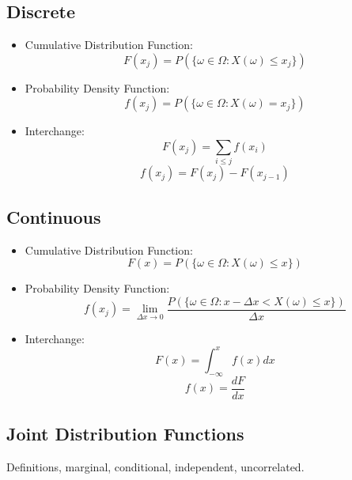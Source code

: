 \documentclass[a4paper,12pt]{article}
\begin{document}
\subsection{Discrete}
\begin{itemize}
\item Cumulative Distribution Function:
\begin{equation}
F(x_j) = P( \{\omega \in \Omega : X(\omega) \le x_j \} )
\end{equation}
\item Probability Density Function:
\begin{equation}
f(x_j) = P( \{ \omega \in \Omega : X(\omega) = x_j \} )
\end{equation}
\item Interchange:
\begin{equation}
F(x_j) = \sum_{i \le j} f(x_i)
\end{equation}
\begin{equation}
f(x_j) = F(x_j) - F(x_{j-1})
\end{equation}
\end{itemize}

\subsection{Continuous}
\begin{itemize}
\item Cumulative Distribution Function:
\begin{equation}
F(x) = P( \{\omega \in \Omega : X(\omega) \le x \} )
\end{equation}
\item Probability Density Function:
\begin{equation}
f(x_j) = \lim_{\Delta x \to 0} \frac{P( \{ \omega \in \Omega : x - \Delta x < X(\omega) \le x \} )}{\Delta x}
\end{equation}
\item Interchange:
\begin{equation}
F(x) = \int_{-\infty}^x f(x) dx
\end{equation}
\begin{equation}
f(x) = \frac{dF}{dx}
\end{equation}
\end{itemize}

\subsection{Joint Distribution Functions}
Definitions, marginal, conditional, independent, uncorrelated.
\end{document}
